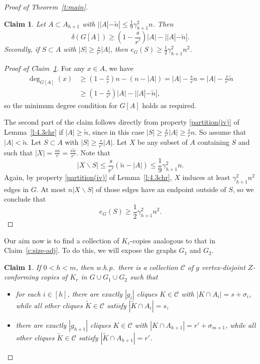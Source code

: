 \documentclass[reqno, 12pt]{amsart}
\numberwithin{equation}{section}
\numberwithin{figure}{section}
\theoremstyle{plain}
\newtheorem{claim}[thm]{Claim}
\theoremstyle{definition}
\def\cC{{\mathcal C}}
\let\setminus=\smallsetminus
\begin{document}
\begin{proof}[Proof of Theorem~\ref{t:main}]
    \begin{claim} \label{c:min-degree-in-A_h+1} Let $A \subset A_{h+1}$ with $||A|-\tilde{n}| \leq \frac 19 \gamma_{h+1}^2 n$. Then 
        \begin{equation*} %
            \delta(G[A])\geq\left(1-\frac{s}{r'}\right)|A| - ||A|-\tilde{n}|.
        \end{equation*}
        Secondly, if $S \subset A$ with $|S| \geq \frac{s}{r'}|A|$, then $e_G(S) \geq \frac 12 \gamma_{h+1}^2 n^2$.
    \end{claim}
    
    \begin{proof}[Proof of Claim~\ref{c:min-degree-in-A_h+1}]
        For any $x\in A$, we have
        \begin{align*}
            \deg_{G[A]}(x) & \geq \left(1-\frac{s}{r}\right)n-(n-|A|) = |A| - \frac{s}{r}n = |A| - \frac{s}{r'} \tilde{n} \\
            & \geq \left(1 - \frac{s}{r'}\right)|A| - ||A|-\tilde{n}|,
        \end{align*}
        so the minimum degree condition for $G[A]$ holds as required.

        The second part of the claim follows directly from property \ref{partition(iv)} of Lemma~\ref{l:4.3chr} if $|A| \geq \tilde{n}$, since in this case $|S|\geq\frac{s}{r'}|A| \geq \frac{s}{r}n$. 
        So assume that $|A|<\tilde{n}$.
        Let $S \subset A$ with $|S| \geq \frac{s}{r'}|A|$. Let $X$ be any subset of $A$ containing $S$ and such that $|X|= \frac{s n}{r} = \frac{s\tilde{n}}{r'}$. Note that
        $$|X \setminus S| \leq \frac{s}{r'}\left(\tilde{n}-|A|\right)\leq \frac 19 \gamma_{h+1}^2 n.$$
        Again, by property \ref{partition(iv)} of Lemma~\ref{l:4.3chr}, $X$ induces at least $\gamma_{h+1}^2 n^2$ edges in $G$. At most $n|X \setminus S| $ of those edges have an endpoint outside of $S$, so we conclude that
        $$e_G(S) \geq \frac 12 \gamma_{h+1}^2 n^2.$$
    \end{proof}
    
    Our aim now is to find a collection of $K_r$-copies analogous to that in Claim~\ref{c:size-adj}. To do this, we will expose the graphs $G_1$ and $G_2$.

    \begin{claim}
        \label{c:size-adj_h}
        If $0<h<m$, then w.h.p.~there is a collection $\cC$ of $g$ vertex-disjoint $Z$-conforming copies of $K_r$ in $G\cup G_1\cup G_2$ such that 
        \begin{itemize}
            \item for each $i\in [h]$, there are exactly $|g_i|$ cliques $K\in \cC$ with $|K\cap A_i|=s+\sigma_i$, while all other cliques $\tilde K\in \cC$ satisfy $|\tilde K\cap A_i|= s$,
            \item there are exactly $|g_{h+1}|$ cliques $K\in \cC$ with $|K\cap A_{h+1}|=r'+\sigma_{m+1}$, while all other cliques $\tilde K\in\cC$ satisfy $|\tilde K\cap A_{h+1}|=r'$.
        \end{itemize}
    \end{claim}


\end{proof}
\end{document}
